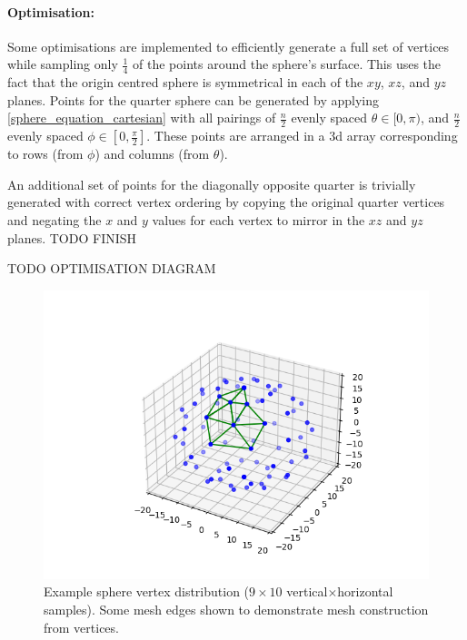 \paragraph{Optimisation:} Some optimisations are implemented to efficiently generate a full set of vertices while sampling only $\frac{1}{4}$ of the points around the sphere's surface. This uses the fact that the origin centred sphere is symmetrical in each of the $xy$, $xz$, and $yz$ planes. Points for the quarter sphere can be generated by applying \cref{sphere_equation_cartesian} with all pairings of $\frac{n}{2}$ evenly spaced $\theta \in [0, \pi)$, and $\frac{n}{2}$ evenly spaced $\phi \in [0, \frac{\pi}{2}]$. These points are arranged in a 3d array corresponding to rows (from $\phi$) and columns (from $\theta$).

An additional set of points for the diagonally opposite quarter is trivially generated with correct vertex ordering by copying the original quarter vertices and negating the $x$ and $y$ values for each vertex to mirror in the $xz$ and $yz$ planes. TODO FINISH 

TODO OPTIMISATION DIAGRAM

\begin{figure}
  \begin{center}
    \includegraphics[width=0.8\linewidth]{assets/images/shapes/sphere_vertices}
    \caption{Example sphere vertex distribution ($9\times10$ vertical$\times$horizontal samples). Some mesh edges shown to demonstrate mesh construction from vertices.}
    \label{fig:sphere_vertices}
  \end{center}
\end{figure}



